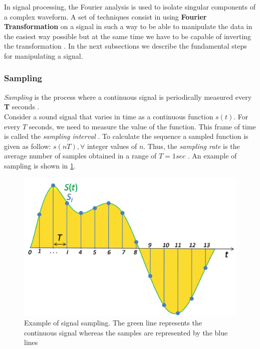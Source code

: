 \noindent In signal processing, the Fourier analysis is used to isolate singular components of a complex waveform. A set of techniques consist in using \textbf{Fourier Transformation} on a signal in such a way to be able to manipulate the data in the easiest way possible but at the same time we have to be capable of inverting the transformation \cite{rabiner1975theory}. In the next subsections we describe the fundamental steps for manipulating a signal.

\subsubsection{Sampling}
\label{ssubs:sampling}

\textit{Sampling} is the process where a continuous signal is periodically measured every \textbf{T} seconds \cite{orfanidis1995introduction}. \\
\noindent Consider a sound signal that varies in time as a continuous function $s(t)$. For every $T$ seconds, we need to measure the value of the function. This frame of time is called the \textit{sampling interval} \cite{weik2012communications}. To calculate the sequence a sampled function is given as follow: $s(nT), \forall$ integer values of $n$. Thus, the \textit{sampling rate} is the average number of samples obtained in a range of $T = 1sec$ \cite{sampling_wiki}. An example of sampling is shown in \ref{fig:sampling_ex}.

\begin{figure}[!ht]
	\centering
	\includegraphics[scale=0.2]{Figures/sampling_example.png}
	\caption{Example of signal sampling. The green line represents the continuous signal whereas the samples are represented by the blue lines \cite{sampling_wiki}}
	\label{fig:sampling_ex}
\end{figure}

